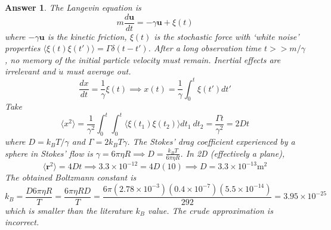 \documentclass[a4paper]{article}
\theoremstyle{new2}
\newtheorem{ans}{Answer}[section]
\theoremstyle{new}
\begin{document}
\begin{ans}
The Langevin equation is
$$m\frac{d\mathbf{u}}{dt}=-\gamma\mathbf{u}+\xi(t)$$
where $-\gamma\mathbf{u}$ is the kinetic friction, $\xi(t)$ is the stochastic force with `white noise' properties $\langle\xi(t)\xi(t')\rangle=\Gamma\delta(t-t')$. After a long observation time $t>>m/\gamma$, no memory of the initial particle velocity must remain. Inertial effects are irrelevant and $\dot{u}$ must average out.
$$\frac{dx}{dt}=\frac{1}{\gamma}\xi(t)\implies x(t)=\frac{1}{\gamma}\int_0^t\xi(t')dt'$$
Take
$$\langle x^2\rangle=\frac{1}{\gamma^2}\int_0^t\int_0^t\langle\xi(t_1)\xi(t_2)\rangle dt_1~dt_2=\frac{\Gamma t}{\gamma^2}=2Dt$$
where $D=k_BT/\gamma$ and $\Gamma=2k_BT\gamma$. The Stokes' drag coefficient experienced by a sphere in Stokes' flow is $\gamma=6\pi\eta R\implies D=\frac{k_BT}{6\pi\eta R}$. In 2D (effectively a plane), 
$$\langle\mathbf{r}^2\rangle=4Dt\implies 3.3\times10^{-12}=4D(10)\implies D=3.3\times10^{-13}\text{m}^2$$
The obtained Boltzmann constant is
$$k_B=\frac{D6\pi\eta R}{T}=\frac{6\pi\eta RD}{T}=\frac{6\pi(2.78\times10^{-3})(0.4\times10^{-7})(5.5\times10^{-14})}{292}=3.95\times10^{-25}$$
which is smaller than the literature $k_B$ value. The crude approximation is incorrect.
\end{ans}
\newpage
\end{document}
